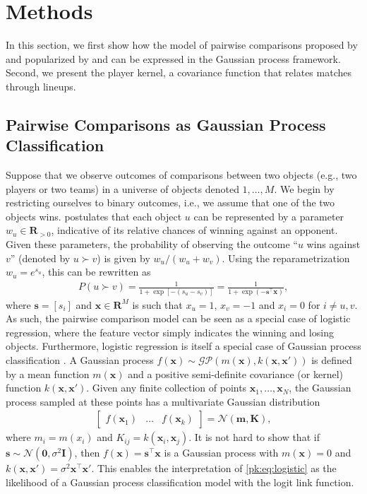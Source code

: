 \section{Methods}
\label{pk:sec:methods}

In this section, we first show how the model of pairwise comparisons proposed by \citet{zermelo1928berechnung} and popularized by \citet{bradley1952rank} and \citet{elo1978rating} can be expressed in the Gaussian process framework.
Second, we present the player kernel, a covariance function that relates matches through lineups.


\subsection{Pairwise Comparisons as Gaussian Process Classification}

Suppose that we observe outcomes of comparisons between two objects (e.g., two players or two teams) in a universe of objects denoted $1, \ldots, M$.
We begin by restricting ourselves to binary outcomes, i.e., we assume that one of the two objects wins.
\citet{zermelo1928berechnung} postulates that each object $u$ can be represented by a parameter $w_u \in \mathbf{R}_{>0}$, indicative of its relative chances of winning against an opponent.
Given these parameters, the probability of observing the outcome ``$u$ wins against $v$'' (denoted by $u \succ v$) is given by $w_u / (w_u + w_v)$.
Using the reparametrization $w_u = e^{s_u}$, this can be rewritten as
\begin{align}
\label{pk:eq:logistic}
P(u \succ v) = \frac{1}{1 + \exp[-(s_u - s_v)]} = \frac{1}{1 + \exp(- \bm{s}^\top \bm{x})},
\end{align}
where $\bm{s} = [s_i]$ and $\bm{x} \in \mathbf{R}^M$ is such that $x_u = 1$, $x_v = -1$ and $x_i = 0$ for $i \ne u, v$.
As such, the pairwise comparison model can be seen as a special case of logistic regression, where the feature vector simply indicates the winning and losing objects.
Furthermore, logistic regression is itself a special case of Gaussian process classification \cite[Ch. 3]{rasmussen2006gaussian}.
A Gaussian process $f(\bm{x}) \sim \mathcal{GP}(m(\bm{x}), k(\bm{x}, \bm{x}'))$ is defined by a mean function $m(\bm{x})$ and a positive semi-definite covariance (or kernel) function $k(\bm{x}, \bm{x}')$.
Given any finite collection of points $\bm{x}_1, \ldots, \bm{x}_N$, the Gaussian process sampled at these points has a multivariate Gaussian distribution
\begin{align*}
\begin{bmatrix}
f(\bm{x}_1) & \dots & f(\bm{x}_k)
\end{bmatrix} = \mathcal{N}(\bm{m}, \bm{K}),
\end{align*}
where $m_i = m(x_i)$ and $K_{ij} = k(\bm{x}_i, \bm{x}_j)$.
It is not hard to show that if $\bm{s} \sim \mathcal{N}(\bm{0}, \sigma^2 \bm{I})$, then $f(\bm{x}) = \bm{s}^\top \bm{x}$ is a Gaussian process with $m(\bm{x}) = 0$ and $k(\bm{x}, \bm{x}') = \sigma^2 \bm{x}^\top \bm{x}'$.
This enables the interpretation of \eqref{pk:eq:logistic} as the likelihood of a Gaussian process classification model with the logit link function.

